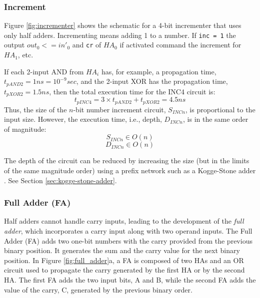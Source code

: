 \subsubsection{Increment}

Figure \ref{fig:incrementer} shows the schematic for a 4-bit incrementer that uses only half adders. Incrementing means adding 1 to a number. If {\tt inc = 1} the output $out_0 <= in'_0$  and {\tt cr} of $HA_0$ if activated command the increment for $HA_1$, etc.


If each 2-input AND from $HA_i$ has, for example,  a propagation time, $t_{pAND2} = 1ns = 10^{-9}sec$, and the 2-input XOR has the propagation time, $t_{pXOR2} = 1.5ns$, then the total execution time for the INC4 circuit is:
$$t_{pINC4} = 3 \times t_{pAND2} + t_{pXOR2} = 4.5ns$$
Thus, the size of the $n$-bit number increment circuit, $S_{INCn}$, is proportional to the input size. However, the execution time, i.e., depth, $D_{INCn}$, is in the same order of magnitude:
$$S_{INCn} \in O(n)$$
$$D_{INCn} \in O(n)$$

The depth of the circuit can be reduced by increasing the size (but in the limits of the same magnitude order) using a prefix network such as a Kogge-Stone adder \cite{kogge1973parallel}. See Section \ref{sec:kogge-stone-adder}.

\subsubsection{Full Adder (FA)}
Half adders cannot handle carry inputs, leading to the development of the \textit{full adder}, which incorporates a carry input along with two operand inputs. The Full Adder (FA) adds two one-bit numbers with the carry provided from the previous binary position. It generates the sum and the carry value for the next binary position. In Figure \ref{fig:full_adder}a, a FA is composed of two HAs and an OR circuit used to propagate the carry generated by the first HA or by the second HA. The first FA adds the two input bits, A and B, while the second FA adds the value of the carry, C, generated by the previous binary order.

